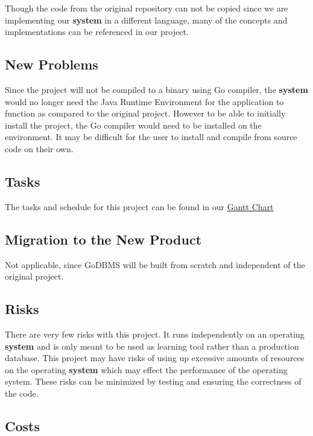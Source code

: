 \documentclass[12pt, titlepage]{article}
\begin{document}
\noindent Though the code from the original repository can not be copied since we are implementing our \textbf{system} in a different language, many of the concepts and implementations can be referenced in our project.

\subsection{New Problems}

Since the project will not be compiled to a binary using Go compiler, the \textbf{system} would no longer need the Java Runtime Environment for the application to function as compared to the original project. However to be able to initially install the project, the Go compiler would need to be installed on the environment. It may be difficult for the user to install and compile from source code on their own.

\subsection{Tasks}

The tasks and schedule for this project can be found in our \href{https://gitlab.cas.mcmaster.ca/ahmedf46/GoDBMS_L01_GRP07/-/blob/main/ProjectSchedule/GanttChart.pdf}{Gantt Chart}

\subsection{Migration to the New Product}

Not applicable, since GoDBMS will be built from scratch and independent of the original project.

\subsection{Risks}

There are very few risks with this project. It runs independently on an operating \textbf{system} and is only meant to be used as learning tool rather than a production database. This project may have risks of using up excessive amounts of resources on the operating \textbf{system} which may effect the performance of the operating system. These risks can be minimized by testing and ensuring the correctness of the code.

\subsection{Costs}
\end{document}
